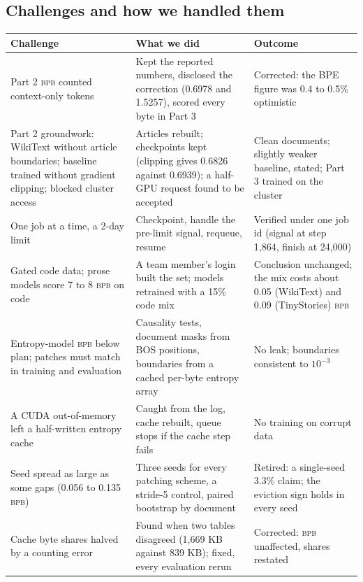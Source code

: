 \documentclass[10pt,twocolumn]{extarticle}
\newcommand{\bpb}{\textsc{bpb}}
\begin{document}
\clearpage
\begin{strip}
\section{Challenges and how we handled them}\label{sec:challenges}
\centering\footnotesize\renewcommand{\arraystretch}{1.0}
\label{tab:chal}
\begin{tabular}{@{}>{\raggedright\arraybackslash}p{3.6cm}>{\raggedright\arraybackslash}p{6.6cm}>{\raggedright\arraybackslash}p{6.4cm}@{}}
\toprule
Challenge & What we did & Outcome\\
\midrule
Part 2 \bpb{} counted context-only tokens & Kept the reported numbers, disclosed the correction (0.6978 and 1.5257), scored every byte in Part 3 & Corrected: the BPE figure was 0.4 to 0.5\% optimistic\\
Part 2 groundwork: WikiText without article boundaries; baseline trained without gradient clipping; blocked cluster access & Articles rebuilt; checkpoints kept (clipping gives 0.6826 against 0.6939); a half-GPU request found to be accepted & Clean documents; slightly weaker baseline, stated; Part 3 trained on the cluster\\
One job at a time, a 2-day limit & Checkpoint, handle the pre-limit signal, requeue, resume & Verified under one job id (signal at step 1,864, finish at 24,000)\\
Gated code data; prose models score 7 to 8 \bpb{} on code & A team member's login built the set; models retrained with a 15\% code mix & Conclusion unchanged; the mix costs about 0.05 (WikiText) and 0.09 (TinyStories) \bpb\\
Entropy-model \bpb{} below plan; patches must match in training and evaluation & Causality tests, document masks from BOS positions, boundaries from a cached per-byte entropy array & No leak; boundaries consistent to $10^{-3}$\\
A CUDA out-of-memory left a half-written entropy cache & Caught from the log, cache rebuilt, queue stops if the cache step fails & No training on corrupt data\\
Seed spread as large as some gaps (0.056 to 0.135 \bpb) & Three seeds for every patching scheme, a stride-5 control, paired bootstrap by document & Retired: a single-seed 3.3\% claim; the eviction sign holds in every seed\\
Cache byte shares halved by a counting error & Found when two tables disagreed (1,669 KB against 839 KB); fixed, every evaluation rerun & Corrected: \bpb{} unaffected, shares restated\\

\end{tabular}
\end{strip}
\end{document}
